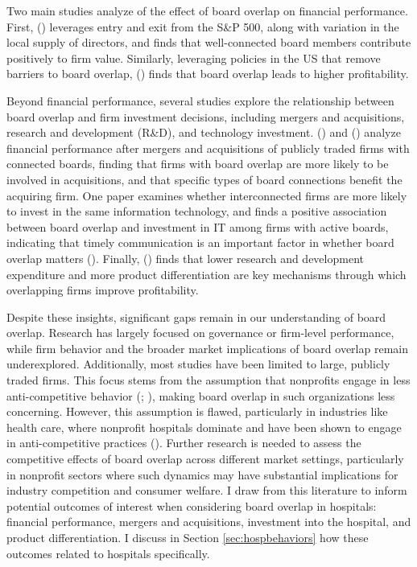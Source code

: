 \documentclass[12pt]{article}
\begin{document}
    Two main studies analyze of the effect of board overlap on financial performance. First, \citeauthor{baran2017director} (\citeyear{baran2017director}) leverages entry and exit from the S\&P 500, along with variation in the local supply of directors, and finds that well-connected board members contribute positively to firm value. Similarly, leveraging policies in the US that remove barriers to board overlap, \citeauthor{geng2021does} (\citeyear{geng2021does}) finds that board overlap leads to higher profitability. 
    
    Beyond financial performance, several studies explore the relationship between board overlap and firm investment decisions, including mergers and acquisitions, research and development (R\&D), and technology investment. \citeauthor{schonlau2009board} (\citeyear{schonlau2009board}) and \citeauthor{cai2012board} (\citeyear{cai2012board}) analyze financial performance after mergers and acquisitions of publicly traded firms with connected boards, finding that firms with board overlap are more likely to be involved in acquisitions, and that specific types of board connections benefit the acquiring firm. One paper examines whether interconnected firms are more likely to invest in the same information technology, and finds a positive association between board overlap and investment in IT among firms with active boards, indicating that timely communication is an important factor in whether board overlap matters (\cite{cheng2021social}). Finally, \citeauthor{geng2021does} (\citeyear{geng2021does}) finds that lower research and development expenditure and more product differentiation are key mechanisms through which overlapping firms improve profitability. 

    Despite these insights, significant gaps remain in our understanding of board overlap. Research has largely focused on governance or firm-level performance, while firm behavior and the broader market implications of board overlap remain underexplored. Additionally, most studies have been limited to large, publicly traded firms. This focus stems from the assumption that nonprofits engage in less anti-competitive behavior (\cite{baer2014clayton}; \cite{aai2013section7}), making board overlap in such organizations less concerning. However, this assumption is flawed, particularly in industries like health care, where nonprofit hospitals dominate and have been shown to engage in anti-competitive practices (\cite{hulver2023ftc}). Further research is needed to assess the competitive effects of board overlap across different market settings, particularly in nonprofit sectors where such dynamics may have substantial implications for industry competition and consumer welfare. I draw from this literature to inform potential outcomes of interest when considering board overlap in hospitals: financial performance, mergers and acquisitions, investment into the hospital, and product differentiation. I discuss in Section \ref{sec:hospbehaviors} how these outcomes related to hospitals specifically. 
\end{document}
